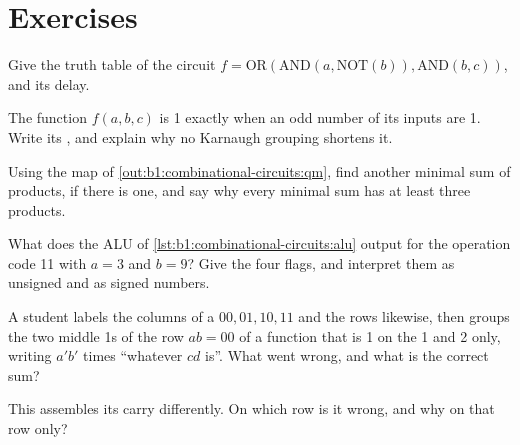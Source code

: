 \section{Exercises}\label{sec:b1:combinational-circuits:exercises}

\begin{exercise}[$\star$]\label{exo:b1:combinational-circuits:1}
Give the truth table of the circuit $f = \text{OR}(\text{AND}(a, \text{NOT}(b)), \text{AND}(b, c))$, and its delay.
\end{exercise}

\begin{exercise}[$\star$]\label{exo:b1:combinational-circuits:2}
The function $f(a, b, c)$ is 1 exactly when an odd number of its inputs are 1. Write its , and
explain why no Karnaugh grouping shortens it.
\end{exercise}

\begin{exercise}[$\star$]\label{exo:b1:combinational-circuits:3}
Using the map of \cref{out:b1:combinational-circuits:qm}, find another minimal sum of products, if there is one, and say
why every minimal sum has at least three products.
\end{exercise}

\begin{exercise}[$\star$]\label{exo:b1:combinational-circuits:4}
What does the ALU of \cref{lst:b1:combinational-circuits:alu} output for the operation code 11 with $a = 3$ and $b = 9$?
Give the four flags, and interpret them as unsigned and as signed numbers.
\end{exercise}

\begin{exercise}[$\star\star$]\label{exo:b1:combinational-circuits:5}
A student labels the columns of a  $00, 01, 10, 11$ and the rows likewise, then groups the two middle 1s of
the row $ab = 00$ of a function that is 1 on the  1 and 2 only, writing $a'b'$ times ``whatever $cd$ is''. What
went wrong, and what is the correct sum?
\end{exercise}

\begin{exercise}[$\star\star$]\label{exo:b1:combinational-circuits:6}
This  assembles its carry differently. On which row is it wrong, and why on that row only?
\end{exercise}

